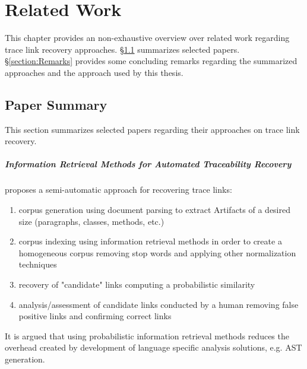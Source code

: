 \chapter{Related Work}
\label{chapter:RelatedWork}
This chapter provides an non-exhaustive overview over related work regarding trace link recovery approaches.
§\ref{section:PaperSummary} summarizes selected papers.
§\ref{section:Remarks} provides some concluding remarks regarding the summarized approaches and the approach used by this thesis.

%
%
%

\section{Paper Summary}
\label{section:PaperSummary}
This section summarizes selected papers regarding their approaches on trace link recovery.

\paragraph*{Information Retrieval Methods for Automated Traceability Recovery}
\cite{DeLucia2012} 
proposes a semi-automatic approach for recovering trace links:
\begin{enumerate}
\item
corpus generation using document parsing to extract \glspl{Artifact} of a desired size (paragraphs, classes, methods, etc.)
\item
corpus indexing using information retrieval methods in order to create a homogeneous corpus removing stop words and applying other normalization techniques
\item
recovery of "candidate" links computing a probabilistic similarity
\item
analysis/assessment of candidate links conducted by a human removing false positive links and confirming correct links
\end{enumerate}
It is argued that using probabilistic information retrieval methods reduces the  overhead created by development of language specific analysis solutions, e.g. \gls{AST} generation.


